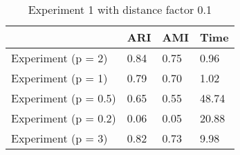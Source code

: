 \begin{table}
\centering
\caption{Experiment 1 with distance factor 0.1}
\begin{tabular}{llll}
\toprule
{} &   ARI &   AMI &   Time \\
\midrule
Experiment (p = 2)   &  0.84 &  0.75 &   0.96 \\
Experiment (p = 1)   &  0.79 &  0.70 &   1.02 \\
Experiment (p = 0.5) &  0.65 &  0.55 &  48.74 \\
Experiment (p = 0.2) &  0.06 &  0.05 &  20.88 \\
Experiment (p = 3)   &  0.82 &  0.73 &   9.98 \\
\bottomrule
\end{tabular}
\end{table}
